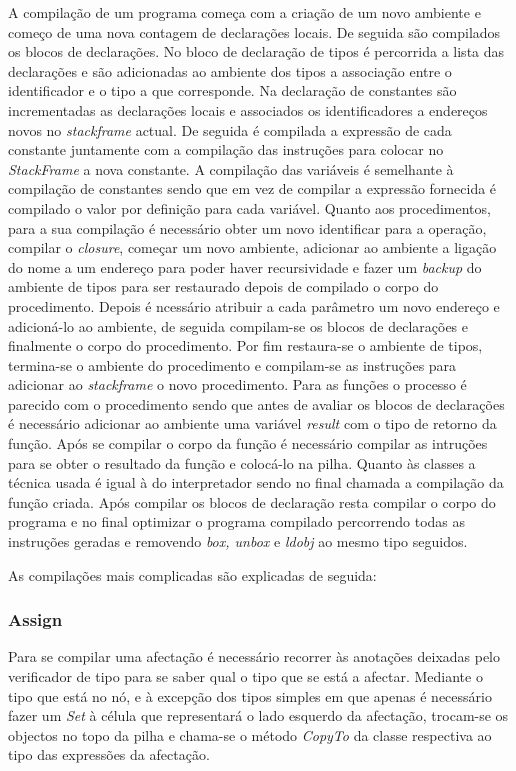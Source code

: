 A compilação de um programa começa com a criação de um novo ambiente e começo 
de uma nova contagem de declarações locais. De seguida são compilados os blocos 
de declarações. No bloco de declaração de tipos é percorrida a lista das 
declarações e são adicionadas ao ambiente dos tipos a associação entre o 
identificador e o tipo a que corresponde. Na declaração de constantes são 
incrementadas as declarações locais e associados os identificadores a endereços 
novos no \emph{stackframe} actual. De seguida é compilada a expressão de cada 
constante juntamente com a compilação das instruções para colocar no 
\emph{StackFrame} a nova constante. A compilação das variáveis é semelhante à 
compilação de constantes sendo que em vez de compilar a expressão fornecida é 
compilado o valor por definição para cada variável. Quanto aos procedimentos, 
para a sua compilação é necessário obter um novo identificar para a operação, 
compilar o \emph{closure}, começar um novo ambiente, adicionar ao ambiente a 
ligação do nome a um endereço para poder haver recursividade e fazer um 
\emph{backup} do ambiente de tipos para ser restaurado depois de compilado o 
corpo do procedimento. Depois é ncessário atribuir a cada parâmetro um novo 
endereço e adicioná-lo ao ambiente, de seguida compilam-se os blocos de 
declarações e finalmente o corpo do procedimento. Por fim restaura-se o 
ambiente de tipos, termina-se o ambiente do procedimento e compilam-se as 
instruções para adicionar ao \emph{stackframe} o novo procedimento. Para as 
funções o processo é parecido com o procedimento sendo que antes de avaliar os 
blocos de declarações é necessário adicionar ao ambiente uma variável 
\emph{result} com o tipo de retorno da função. Após se compilar o corpo da 
função é necessário compilar as intruções para se obter o resultado da função 
e colocá-lo na pilha. Quanto às classes a técnica usada é igual à do 
interpretador sendo no final chamada a compilação da função criada.
Após compilar os blocos de declaração resta compilar o corpo do programa e no 
final optimizar o programa compilado percorrendo todas as instruções geradas e 
removendo \emph{box, unbox} e \emph{ldobj} ao mesmo tipo seguidos.

\newpage
As compilações mais complicadas são explicadas de seguida:

\subsubsection{Assign}

Para se compilar uma afectação é necessário recorrer às anotações deixadas pelo 
verificador de tipo para se saber qual o tipo que se está a afectar. Mediante o 
tipo que está no nó, e à excepção dos tipos simples em que apenas é necessário 
fazer um \emph{Set} à célula que representará o lado esquerdo da afectação, 
trocam-se os objectos no topo da pilha e chama-se o método \emph{CopyTo} da 
classe respectiva ao tipo das expressões da afectação.

